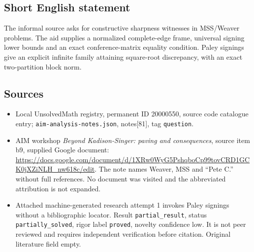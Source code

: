 \documentclass[11pt]{article}
\begin{document}
\subsection{Short English statement}
The informal source asks for constructive sharpness witnesses in MSS/Weaver problems. The aid supplies a normalized complete-edge frame, universal signing lower bounds and an exact conference-matrix equality condition. Paley signings give an explicit infinite family attaining square-root discrepancy, with an exact two-partition block norm.
\subsection{Sources}
\begin{itemize}
\item Local UnsolvedMath registry, permanent ID 20000550, source code catalogue entry; \texttt{aim-analysis-notes.json}, notes[81], tag \texttt{question}.
\item AIM workshop \emph{Beyond Kadison-Singer: paving and consequences}, source item b9, supplied Google document: \url{https://docs.google.com/document/d/1XRw0WyG5PshqboCp99tovCRD1GCK0jXZiNLH_nw618c/edit}. The note names Weaver, MSS and ``Pete C.'' without full references. No document was visited and the abbreviated attribution is not expanded.
\item Attached machine-generated research attempt 1 invokes Paley signings without a bibliographic locator. Result \texttt{partial\_result}, status \texttt{partially\_solved}, rigor label \texttt{proved}, novelty confidence low. It is not peer reviewed and requires independent verification before citation. Original literature field empty.
\end{itemize}
\end{document}
